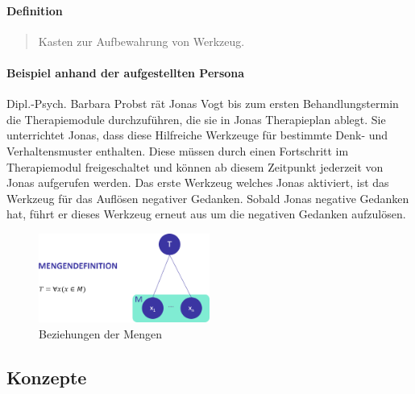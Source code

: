 \paragraph{Definition}
\begin{quote}
Kasten zur Aufbewahrung von Werkzeug. \cite{DudenWer23:online}
\end{quote}

\paragraph{Beispiel anhand der aufgestellten Persona}
Dipl.-Psych. Barbara Probst rät Jonas Vogt bis zum ersten Behandlungstermin die Therapiemodule durchzuführen, die sie in Jonas Therapieplan ablegt. Sie unterrichtet Jonas, dass diese Hilfreiche Werkzeuge für bestimmte Denk- und Verhaltensmuster enthalten. Diese müssen durch einen Fortschritt im Therapiemodul freigeschaltet und können ab diesem Zeitpunkt jederzeit von Jonas aufgerufen werden. Das erste Werkzeug welches Jonas aktiviert, ist das Werkzeug für das Auflösen negativer Gedanken. Sobald Jonas negative Gedanken hat, führt er dieses Werkzeug erneut aus um die negativen Gedanken aufzulösen.

\begin{figure}[h]
\centering
\includegraphics[width=0.5\textwidth]{pictures/therapiedef}
\caption{Beziehungen der Mengen}
\label{therapiedef}
\end{figure}

\subsection{Konzepte}

